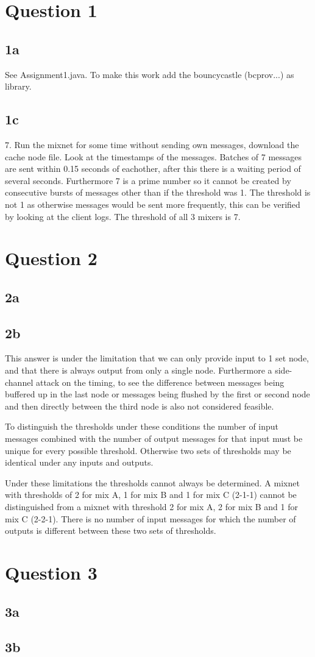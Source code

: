 \documentclass{article}
\begin{document}
\section*{Question 1}
\subsection*{1a}
 See Assignment1.java. To make this work add the bouncycastle (bcprov...) as library.
\subsection*{1c}
7. Run the mixnet for some time without sending own messages, download the cache node file. Look at the timestamps of the messages. Batches of 7 messages are sent within 0.15 seconds of eachother, after this there is a waiting period of several seconds. Furthermore 7 is a prime number so it cannot be created by consecutive bursts of messages other than if the threshold was 1. The threshold is not 1 as otherwise messages would be sent more frequently, this can be verified by looking at the client logs. The threshold of all 3 mixers is 7.

\section*{Question 2}
\subsection*{2a}
\subsection*{2b}
This answer is under the limitation that we can only provide input to 1 set node, and that there is always output from only a single node. Furthermore a side-channel attack on the timing, to see the difference between messages being buffered up in the last node or messages being flushed by the first or second node and then directly between the third node is also not considered feasible.

To distinguish the thresholds under these conditions the number of input messages combined with the number of output messages for that input must be unique for every possible threshold. Otherwise two sets of thresholds may be identical under any inputs and outputs.

Under these limitations the thresholds cannot always be determined. A mixnet with thresholds of 2 for mix A, 1 for mix B and 1 for mix C (2-1-1) cannot be distinguished from a mixnet with threshold 2 for mix A, 2 for mix B and 1 for mix C (2-2-1). There is no number of input messages for which the number of outputs is different between these two sets of thresholds.

\section*{Question 3}
\subsection*{3a}
\subsection*{3b}
\end{document}
